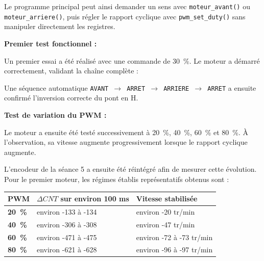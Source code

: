 \documentclass[11pt,a4paper]{article}
\begin{document}
\begin{sessionbox}
		\begin{center}
		\end{center}
		
		Le programme principal peut ainsi demander un sens avec \texttt{moteur\_avant()} ou \texttt{moteur\_arriere()}, puis régler le rapport cyclique avec \texttt{pwm\_set\_duty()} sans manipuler directement les registres.
		
		\vspace{0.3cm}
		
		\textbf{Premier test fonctionnel :}
		
		Un premier essai a été réalisé avec une commande de 30~\%. Le moteur a démarré correctement, validant la chaîne complète :
		
		\begin{center}
		\end{center}
		
		Une séquence automatique \texttt{AVANT $\rightarrow$ ARRET $\rightarrow$ ARRIERE $\rightarrow$ ARRET} a ensuite confirmé l'inversion correcte du pont en H.
		
		\vspace{0.3cm}
		
		\textbf{Test de variation du PWM :}
		
		Le moteur a ensuite été testé successivement à 20~\%, 40~\%, 60~\% et 80~\%. À l'observation, sa vitesse augmente progressivement lorsque le rapport cyclique augmente.
		
		L'encodeur de la séance 5 a ensuite été réintégré afin de mesurer cette évolution. Pour le premier moteur, les régimes établis représentatifs obtenus sont :
		
		\begin{center}
			\begin{tabular}{>{\bfseries}p{3.5cm}p{4cm}p{4.5cm}}
				\toprule
				PWM & $\Delta CNT$ sur environ 100 ms & Vitesse stabilisée \\
				\midrule
				20~\% & environ -133 à -134 & environ -20 tr/min \\
				40~\% & environ -306 à -308 & environ -47 tr/min \\
				60~\% & environ -471 à -475 & environ -72 à -73 tr/min \\
				80~\% & environ -621 à -628 & environ -96 à -97 tr/min \\
				\bottomrule
			\end{tabular}
		\end{center}
		

\end{sessionbox}
\end{document}
